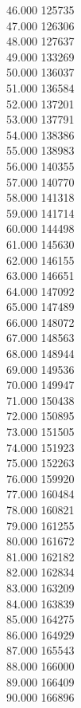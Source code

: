 { 46.000	125735 \\
 47.000	126306 \\
 48.000	127637 \\
 49.000	133269 \\
 50.000	136037 \\
 51.000	136584 \\
 52.000	137201 \\
 53.000	137791 \\
 54.000	138386 \\
 55.000	138983 \\
 56.000	140355 \\
 57.000	140770 \\
 58.000	141318 \\
 59.000	141714 \\
 60.000	144498 \\
 61.000	145630 \\
 62.000	146155 \\
 63.000	146651 \\
 64.000	147092 \\
 65.000	147489 \\
 66.000	148072 \\
 67.000	148563 \\
 68.000	148944 \\
 69.000	149536 \\
 70.000	149947 \\
 71.000	150438 \\
 72.000	150895 \\
 73.000	151505 \\
 74.000	151923 \\
 75.000	152263 \\
 76.000	159920 \\
 77.000	160484 \\
 78.000	160821 \\
 79.000	161255 \\
 80.000	161672 \\
 81.000	162182 \\
 82.000	162834 \\
 83.000	163209 \\
 84.000	163839 \\
 85.000	164275 \\
 86.000	164929 \\
 87.000	165543 \\
 88.000	166000 \\
 89.000	166409 \\
 90.000	166896 \\
}
